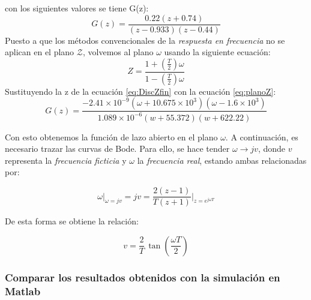 con los siguientes valores se tiene G(z):
\begin{equation}
	G(z) = \frac{0.22(z+0.74)}{(z-0.933)(z-0.44)}
	\label{eq:DiscZfin}
\end{equation}
Puesto a que los métodos convencionales de la \emph{respuesta en frecuencia} no se aplican en el plano $\mathcal{Z}$, volvemos al plano $\omega$ usando la siguiente ecuación:
\begin{equation}
	Z = \frac{1+(\frac{T}{2})\omega}{1-(\frac{T}{2})\omega}
	\label{eq:planoZ}
\end{equation}
Sustituyendo la z de la ecuación \ref{eq:DiscZfin} con la ecuación \ref{eq:planoZ}:
\begin{equation}
	G(z) = \frac{-2.41 \times 10^{-9} (\omega +10.675 \times 10^{3})(\omega - 1.6 \times 10^{3})}{1.089 \times 10^{-6} (w + 55.372)(w + 622.22)}
\end{equation}

Con esto obtenemos la función de lazo abierto en el plano $\mathcal{\omega}$.  
A continuación, es necesario trazar las curvas de Bode. Para ello, se hace tender $\omega \rightarrow jv$, donde $v$ representa la \emph{frecuencia ficticia} y $\omega$ la \emph{frecuencia real}, estando ambas relacionadas por:

\begin{equation}
	\omega \big|_{\omega = jv} = jv = \frac{2(z-1)}{T(z+1)}\bigg|_{z = e^{j\omega T}}
	\label{Relavw}
\end{equation}

De esta forma se obtiene la relación:

\begin{equation}
	v = \frac{2}{T}\,\tan\!\left(\frac{\omega T}{2}\right)
\end{equation}

\subsubsection{Comparar los resultados obtenidos con la simulación en Matlab}
